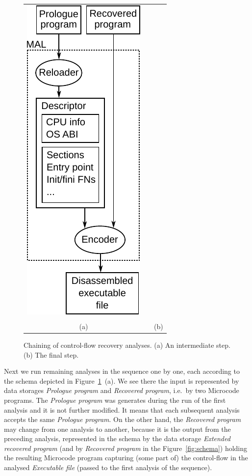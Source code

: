 \documentclass[10pt,twocolumn]{article}
\begin{document}
\begin{figure}[!ht]
\begin{center}
\begin{tabular}{ccc}
\includegraphics{./fig_schema_encoding}
\\ \\
(a) & & (b)
\end{tabular}
\end{center}
\caption{Chaining of control-flow recovery analyses. (a) An intermediate step.
(b) The final step.}
\label{fig:schema_chaining}
\end{figure}

Next we run remaining analyses in the sequence one by one, each according to the
schema depicted in Figure~\ref{fig:schema_chaining}~(a). We see there the input
is represented by data storages \emph{Prologue program} and \emph{Recovered
program}, i.e.~by two Microcode programs. The \emph{Prologue program} was
generates during the run of the first analysis and it is not further modified.
It means that each subsequent analysis accepts the same \emph{Prologue program}.
On the other hand, the \emph{Recovered program} may change from one analysis to
another, because it is the output from the preceding analysis, represented in
the schema by the data storage \emph{Extended recovered program} (and by
\emph{Recovered program} in the Figure~\ref{fig:schema}) holding the resulting
Microcode program capturing (some part of) the control-flow in the analysed
\emph{Executable file} (passed to the first analysis of the sequence).
\end{document}
